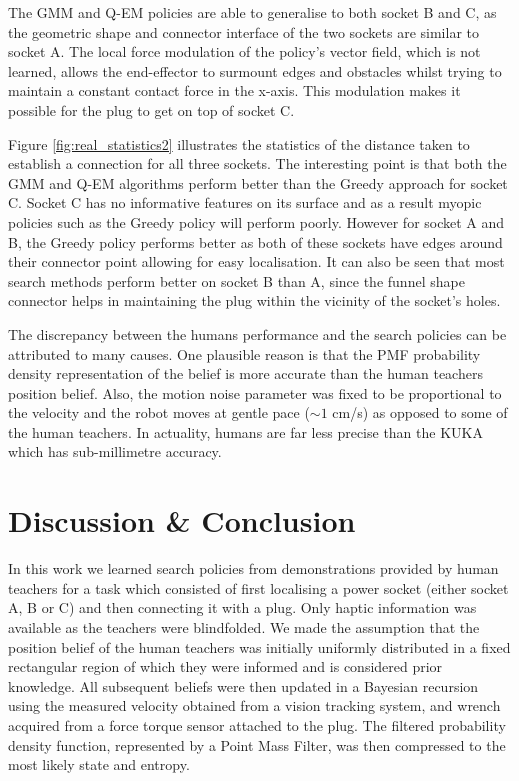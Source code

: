 The GMM and Q-EM policies are able to generalise to both socket B and C, as the geometric shape and connector interface of the 
two sockets are similar to socket A. The local force modulation of the policy's vector field, which is not learned, allows the 
end-effector to surmount edges and obstacles whilst trying to maintain a constant contact force in the x-axis. This modulation makes it possible for the plug to get on top of socket C.

Figure \ref{fig:real_statistics2} illustrates the statistics of the distance taken to establish a connection for all three sockets. 
The interesting point is that both the GMM and Q-EM algorithms perform better than the Greedy approach for socket C. Socket C has no informative 
features on its surface and as a result myopic policies such as the Greedy policy will perform poorly. However for socket A 
and B, the Greedy policy performs better as both of these sockets have edges around their connector point allowing for easy localisation. 
It can also be seen that most search methods perform better on socket B than A, since the funnel shape connector helps in maintaining the plug 
within the vicinity of the socket's holes. 


The discrepancy between the humans performance and the search policies can be attributed to many causes. One plausible reason is 
that the PMF probability density representation of the belief is more accurate than the human teachers position belief. 
Also, the motion noise parameter was fixed to be proportional to the velocity and the robot moves at gentle pace ($\sim1$ cm/s) as 
opposed to some of the human teachers. In actuality, humans are far less precise than the KUKA which has sub-millimetre accuracy.

\section{Discussion \& Conclusion}\label{ch4:conclusion}
%
%
%

In this work we learned search policies from demonstrations provided by human teachers for a task
which consisted of first localising a power socket (either socket A, B or C) and then connecting it with a plug. Only haptic information 
was available as the teachers were blindfolded. We made the assumption that the position belief of the human teachers 
was initially uniformly distributed in a fixed rectangular region of which they were 
informed and is considered prior knowledge. All subsequent beliefs were then updated in a Bayesian recursion 
using the measured velocity obtained from a vision tracking system, and wrench acquired from a force torque sensor attached 
to the plug. The filtered probability density function, represented by a Point Mass Filter, was then compressed to the 
most likely state and entropy.

